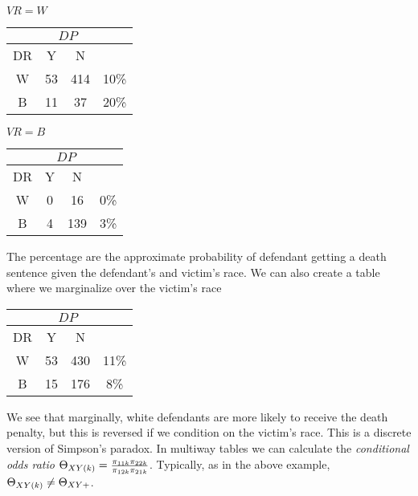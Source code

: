 $VR=W$
\begin{center}
    \begin{tabular}{c|cc|c}
        &\multicolumn{2}{c|}{$DP$}&\\
        \hline
        DR&Y&N&\\
        \hline
        W&53&414&10\%\\
        B&11&37&20\%
        
    \end{tabular}
\end{center}
$VR=B$
\begin{center}
    \begin{tabular}{c|cc|c}
        &\multicolumn{2}{c|}{$DP$}&\\
        \hline
        DR&Y&N&\\
        \hline
        W&0&16&0\%\\
        B&4&139&3\%     
    \end{tabular}
\end{center}
The percentage are the approximate probability of defendant getting a death sentence given the defendant's and victim's race. We can also create a table where we marginalize over the victim's race
\begin{center}
    \begin{tabular}{c|cc|c}
        &\multicolumn{2}{c|}{$DP$}&\\
        \hline
        DR&Y&N&\\
        \hline
        W&53&430&11\%\\
        B&15&176&8\%     
    \end{tabular}
\end{center}
We see that marginally, white defendants are more likely to receive the death penalty, but this is reversed if we condition on the victim's race. This is a discrete version of Simpson's paradox. In multiway tables we can calculate the \emph{conditional odds ratio} ${\Theta}_{XY(k)} = \frac{\pi_{11k}\pi_{22k}}{\pi_{12k}\pi_{21k}}$. Typically, as in the above example, ${\Theta}_{XY(k)}\neq {\Theta}_{XY+}$.


